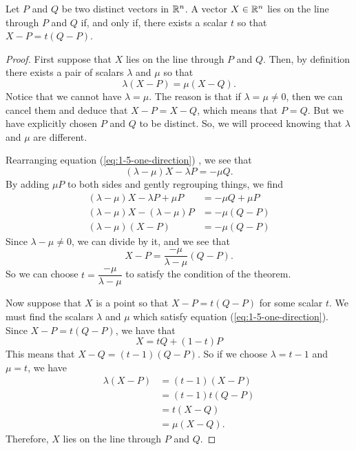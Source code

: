\documentclass[elementsmain.tex]{subfiles}
\begin{document}
\begin{theorem} \label{thm:one-direction}
Let $P$ and $Q$ be two distinct vectors in $\mathbb{R}^n$.
A vector $X\in\mathbb{R}^n$ lies on the line through $P$ and $Q$ if, and only if, there exists a scalar $t$ so that $X-P = t(Q-P)$.
\end{theorem}

\begin{proof}
First suppose that $X$ lies on the line through $P$ and $Q$. Then, by definition there exists a pair of scalars $\lambda$ and $\mu$ so that 
\begin{equation}\label{eq:1-5-one-direction}
\lambda(X-P) = \mu(X-Q).
\end{equation}
Notice that we cannot have $\lambda=\mu$. The reason is that if $\lambda = \mu \neq 0$, then we can cancel them and deduce that $X-P = X-Q$, which means that $P=Q$. But we have explicitly chosen $P$ and $Q$ to be distinct. So, we will proceed knowing that $\lambda$ and $\mu$ are different.

Rearranging equation (\ref{eq:1-5-one-direction}) , we see that
\[
(\lambda-\mu)X - \lambda P = -\mu Q.
\]
By adding $\mu P$ to both sides and gently regrouping things, we find
\begin{align*}
(\lambda - \mu) X -\lambda P + \mu P &= - \mu Q + \mu P \\
(\lambda - \mu) X - (\lambda -\mu)P &= -\mu (Q - P) \\
(\lambda - \mu) (X - P) &= -\mu (Q - P)
\end{align*}
Since $\lambda - \mu \neq 0$, we can divide by it, and we see that
\[
X - P = \dfrac{-\mu}{\lambda-\mu} (Q-P).
\]
So we can choose $t = \dfrac{-\mu}{\lambda-\mu}$ to satisfy the condition of the theorem.

Now suppose that $X$ is a point so that $X-P = t (Q-P)$ for some scalar $t$.
We must find the scalars $\lambda$ and $\mu$ which satisfy equation (\ref{eq:1-5-one-direction}). Since $X-P = t(Q-P)$, we have that 
\begin{equation}\label{eq:symmetric-line}
X = tQ + (1-t)P
\end{equation}
This means that $X-Q = (t-1)(Q-P)$. So if we choose $\lambda = t-1$ and $\mu = t$, we have
\[
\begin{split}
\lambda (X-P) & = (t-1) (X-P) \\
		& = (t-1) t (Q-P) \\
		& = t (X-Q) \\
		& = \mu (X-Q).
\end{split}
\]
Therefore, $X$ lies on the line through $P$ and $Q$.
\end{proof}
\end{document}
